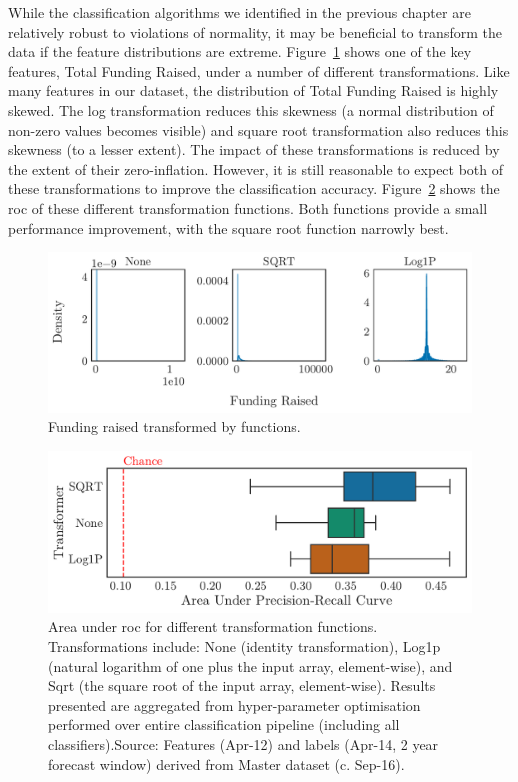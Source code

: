 \documentclass[../thesis/thesis.tex]{subfiles}
\begin{document}
While the classification algorithms we identified in the previous chapter are relatively robust to violations of normality, it may be beneficial to transform the data if the feature distributions are extreme. Figure~\ref{fig:design:funding_transformation} shows one of the key features, Total Funding Raised, under a number of different transformations. Like many features in our dataset, the distribution of Total Funding Raised is highly skewed. The log transformation reduces this skewness (a normal distribution of non-zero values becomes visible) and square root transformation also reduces this skewness (to a lesser extent). The impact of these transformations is reduced by the extent of their zero-inflation. However, it is still reasonable to expect both of these transformations to improve the classification accuracy. Figure~\ref{fig:design:transformer} shows the \gls{roc} of these different transformation functions. Both functions provide a small performance improvement, with the square root function narrowly best.

\begin{figure}[!htb]
    \centering
    \includegraphics[width=\textwidth]{../figures/design/distribution_funding_transformed}
    \caption[Funding raised transformed by functions]{Funding raised transformed by functions.}
    \label{fig:design:funding_transformation}
\end{figure}

\begin{figure}[!htb]
    \centering
    \includegraphics[width=\textwidth]{../figures/design/auc_transformer}
    \caption[Area under PR Curves by transformation function]{Area under \gls{roc} for different transformation functions. Transformations include: None (identity transformation), Log1p (natural logarithm of one plus the input array, element-wise), and Sqrt (the square root of the input array, element-wise). Results presented are aggregated from hyper-parameter optimisation performed over entire classification pipeline (including all classifiers).Source: Features (Apr-12) and labels (Apr-14, 2 year forecast window) derived from Master dataset (c. Sep-16).}
    \label{fig:design:transformer}
\end{figure}
\end{document}
